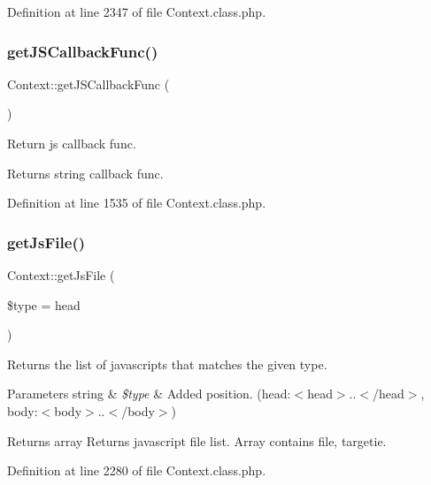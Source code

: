 Definition at line 2347 of file Context.\+class.\+php.

\hypertarget{classContext_ab2e157a87d2b960d78b2c3f35ae7da23}{}\label{classContext_ab2e157a87d2b960d78b2c3f35ae7da23} 
\subsubsection{\texorpdfstring{get\+J\+S\+Callback\+Func()}{getJSCallbackFunc()}}
{\footnotesize\ttfamily Context\+::get\+J\+S\+Callback\+Func (\begin{DoxyParamCaption}{ }\end{DoxyParamCaption})}

Return js callback func. \begin{DoxyReturn}{Returns}
string callback func. 
\end{DoxyReturn}


Definition at line 1535 of file Context.\+class.\+php.

\hypertarget{classContext_a9989fb9f7be0a978df65e50462460317}{}\label{classContext_a9989fb9f7be0a978df65e50462460317} 
\subsubsection{\texorpdfstring{get\+Js\+File()}{getJsFile()}}
{\footnotesize\ttfamily Context\+::get\+Js\+File (\begin{DoxyParamCaption}\item[{}]{\$type = {\ttfamily \textquotesingle{}head\textquotesingle{}} }\end{DoxyParamCaption})}

Returns the list of javascripts that matches the given type.


\begin{DoxyParams}[1]{Parameters}
string & {\em \$type} & Added position. (head\+:$<$head$>$..$<$/head$>$, body\+:$<$body$>$..$<$/body$>$) \\
\hline
\end{DoxyParams}
\begin{DoxyReturn}{Returns}
array Returns javascript file list. Array contains file, targetie. 
\end{DoxyReturn}


Definition at line 2280 of file Context.\+class.\+php.

